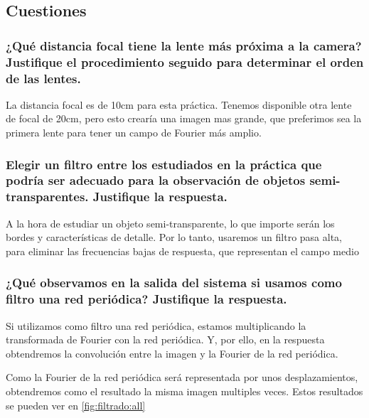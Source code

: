 \documentclass{./packages/optica-article}
\begin{document}
\subsection{Cuestiones}
\subsubsection{¿Qué distancia focal tiene la lente más próxima a la camera? Justifique el procedimiento seguido para determinar el orden de las lentes.}
La distancia focal es de 10cm para esta práctica. Tenemos disponible otra lente de focal de 20cm, pero esto crearía una imagen mas grande, que preferimos sea la primera lente para tener un campo de Fourier más amplio.

\subsubsection{Elegir un filtro entre los estudiados en la práctica que podría ser adecuado para la observación de objetos semi-transparentes. Justifique la respuesta.}

A la hora de estudiar un objeto semi-transparente, lo que importe serán los bordes y características de detalle. Por lo tanto, usaremos un filtro pasa alta, para eliminar las frecuencias bajas de respuesta, que representan el campo medio


\subsubsection{¿Qué observamos en la salida del sistema si usamos como filtro una red periódica? Justifique la respuesta.}
Si utilizamos como filtro una red periódica, estamos multiplicando la transformada de Fourier con la red periódica. Y, por ello, en la respuesta obtendremos la convolución entre la imagen y la Fourier de la red periódica.

Como la Fourier de la red periódica será representada por unos desplazamientos, obtendremos como el resultado la misma imagen multiples veces. Estos resultados se pueden ver en \ref{fig:filtrado:all}
\end{document}

